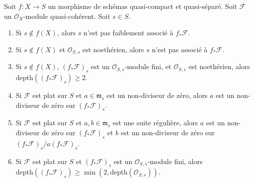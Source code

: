 \begin{lemma}
\label{lemma-depth-pushforward}
Soit  $f : X \to S$  un morphisme de schémas quasi-compact et quasi-séparé. Soit
 $\mathcal{F}$  un  $\mathcal{O}_X$-module quasi-cohérent. Soit  $s \in S$.
\begin{enumerate}
\item Si  $s \not \in f(X)$, alors  $s$  n'est pas faiblement associé à  $f_*\mathcal{F}$.
\item Si  $s \not \in f(X)$  et  $\mathcal{O}_{S, s}$  est noethérien, alors  $s$  n'est pas
associé à  $f_*\mathcal{F}$.
\item Si  $s \not \in f(X)$,  $(f_*\mathcal{F})_s$  est un  $\mathcal{O}_{S, s}$-module fini, et  $\mathcal{O}_{S, s}$  est
noethérien, alors  $\text{depth}((f_*\mathcal{F})_s) \geq 2$.
\item Si  $\mathcal{F}$  est plat sur  $S$  et  $a \in \mathfrak m_s$  est un non-diviseur de
zéro, alors  $a$  est un non-diviseur de zéro sur  $(f_*\mathcal{F})_s$.
\item Si  $\mathcal{F}$  est plat sur  $S$  et  $a, b \in \mathfrak m_s$  est une suite régulière,
alors  $a$  est un non-diviseur de zéro sur  $(f_*\mathcal{F})_s$  et  $b$ 
est un non-diviseur de zéro sur  $(f_*\mathcal{F})_s/a(f_*\mathcal{F})_s$.
\item Si  $\mathcal{F}$  est plat sur  $S$  et  $(f_*\mathcal{F})_s$  est un
 $\mathcal{O}_{S, s}$-module fini, alors  $\text{depth}((f_*\mathcal{F})_s) \geq
\min(2, \text{depth}(\mathcal{O}_{S, s}))$.
\end{enumerate}
\end{lemma}


